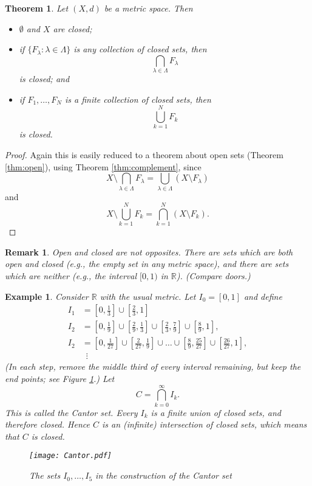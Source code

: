 \documentclass[a4paper,reqno]{amsart}
\numberwithin{equation}{section}
\newtheorem{theorem}[definition]{Theorem}
\newtheorem{remark}[definition]{Remark}
\newtheorem{example}{Example}
\def\R{\mathbb{R}}
\begin{document}
\begin{theorem}
Let $(X,d)$ be a metric space. Then
\begin{itemize}
\item $\emptyset$ and $X$ are closed;
\item if $\{F_\lambda: \lambda \in \Lambda\}$ is any collection
of closed sets, then
\[
\bigcap_{\lambda \in \Lambda} F_\lambda
\]
is closed; and
\item if $F_1, \ldots, F_N$ is a finite collection of
closed sets, then
\[
\bigcup_{k = 1}^N F_k
\]
is closed.
\end{itemize}
\end{theorem}

\begin{proof}
Again this is easily reduced to a theorem about open sets (Theorem \ref{thm:open}), using Theorem \ref{thm:complement}, since
$$
X\setminus \bigcap_{\lambda \in \Lambda} F_\lambda = \bigcup_{\lambda \in \Lambda} (X\setminus F_\lambda)
$$
and
$$
X\setminus \bigcup_{k = 1}^N F_k = \bigcap_{k = 1}^N (X\setminus F_k).
$$
\end{proof}

\begin{remark}
Open and closed are not opposites. There are sets
which are both open and closed (e.g., the empty set in any metric space), and there
are sets which are neither (e.g., the interval $[0,1)$ in $\R$). (Compare doors.)
\end{remark}



\begin{example}\label{C:set}
Consider $\R$ with the usual metric. Let $I_0 = [0,1]$ and define
\begin{align*}
I_1 & = \textstyle [0,\frac{1}{3}] \cup [\frac{2}{3},1] \\
I_2 & = \textstyle [0,\frac{1}{9}] \cup [\frac{2}{9},\frac{1}{3}] \cup [\frac{2}{3},\frac{7}{9}] \cup [\frac{8}{9},1], \\
I_2 & = \textstyle [0,\frac{1}{27}] \cup [\frac{2}{27},\frac{1}{9}] \cup \ldots \cup  [\frac{8}{9},\frac{25}{27}] \cup [\frac{26}{27},1], \\
& \hspace{6pt} \vdots
\end{align*}
(In each step, remove the middle third of every interval remaining, but keep the end points; see Figure \ref{fig:Cantor}.)
Let
\[
C = \bigcap_{k = 0}^\infty I_k.
\]
This is called the Cantor set.  Every $I_k$ is a finite union of closed sets, and therefore closed.
Hence $C$ is an (infinite) intersection of closed sets, which means that $C$ is closed.
\begin{figure}[ht]
\begin{center}
\texttt{[image: Cantor.pdf]}
\end{center}
\caption{The sets $I_0,\ldots,I_5$ in the construction of the Cantor set}
\label{fig:Cantor}
\end{figure}
\end{example}
\end{document}
